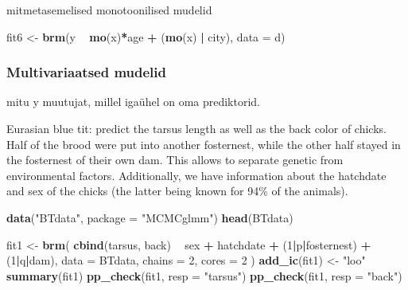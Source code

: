 \documentclass[]{article}
\newenvironment{Shaded}{\begin{snugshade}}{\end{snugshade}}
\newcommand{\KeywordTok}[1]{\textcolor[rgb]{0.13,0.29,0.53}{\textbf{#1}}}
\newcommand{\DataTypeTok}[1]{\textcolor[rgb]{0.13,0.29,0.53}{#1}}
\newcommand{\DecValTok}[1]{\textcolor[rgb]{0.00,0.00,0.81}{#1}}
\newcommand{\StringTok}[1]{\textcolor[rgb]{0.31,0.60,0.02}{#1}}
\newcommand{\OperatorTok}[1]{\textcolor[rgb]{0.81,0.36,0.00}{\textbf{#1}}}
\newcommand{\NormalTok}[1]{#1}
\begin{document}
mitmetasemelised monotoonilised mudelid

\begin{Shaded}
\begin{Highlighting}[]
\NormalTok{fit6 <-}\StringTok{ }\KeywordTok{brm}\NormalTok{(y }\OperatorTok{~}\StringTok{ }\KeywordTok{mo}\NormalTok{(x)}\OperatorTok{*}\NormalTok{age }\OperatorTok{+}\StringTok{ }\NormalTok{(}\KeywordTok{mo}\NormalTok{(x) }\OperatorTok{|}\StringTok{ }\NormalTok{city), }\DataTypeTok{data =}\NormalTok{ d)}
\end{Highlighting}
\end{Shaded}

\subsubsection{Multivariaatsed mudelid}\label{multivariaatsed-mudelid}

mitu y muutujat, millel igaühel on oma prediktorid.

Eurasian blue tit: predict the tarsus length as well as the back color
of chicks. Half of the brood were put into another fosternest, while the
other half stayed in the fosternest of their own dam. This allows to
separate genetic from environmental factors. Additionally, we have
information about the hatchdate and sex of the chicks (the latter being
known for 94\% of the animals).

\begin{Shaded}
\begin{Highlighting}[]
\KeywordTok{data}\NormalTok{(}\StringTok{"BTdata"}\NormalTok{, }\DataTypeTok{package =} \StringTok{"MCMCglmm"}\NormalTok{)}
\KeywordTok{head}\NormalTok{(BTdata)}
\end{Highlighting}
\end{Shaded}

\begin{Shaded}
\begin{Highlighting}[]
\NormalTok{fit1 <-}\StringTok{ }\KeywordTok{brm}\NormalTok{(}
  \KeywordTok{cbind}\NormalTok{(tarsus, back) }\OperatorTok{~}\StringTok{ }\NormalTok{sex }\OperatorTok{+}\StringTok{ }\NormalTok{hatchdate }\OperatorTok{+}\StringTok{ }\NormalTok{(}\DecValTok{1}\OperatorTok{|}\NormalTok{p}\OperatorTok{|}\NormalTok{fosternest) }\OperatorTok{+}\StringTok{ }\NormalTok{(}\DecValTok{1}\OperatorTok{|}\NormalTok{q}\OperatorTok{|}\NormalTok{dam),}
  \DataTypeTok{data =}\NormalTok{ BTdata, }\DataTypeTok{chains =} \DecValTok{2}\NormalTok{, }\DataTypeTok{cores =} \DecValTok{2}
\NormalTok{)}
\KeywordTok{add_ic}\NormalTok{(fit1) <-}\StringTok{ "loo"}
\KeywordTok{summary}\NormalTok{(fit1)}
\KeywordTok{pp_check}\NormalTok{(fit1, }\DataTypeTok{resp =} \StringTok{"tarsus"}\NormalTok{)}
\KeywordTok{pp_check}\NormalTok{(fit1, }\DataTypeTok{resp =} \StringTok{"back"}\NormalTok{)}
\end{Highlighting}
\end{Shaded}
\end{document}
